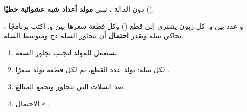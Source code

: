 \begin{statement}
دون الدالة ، نبني \textbf{مولد أعداد شبه عشوائية خطيًا} (): \par{\centering\small{}\par}، و عدد بين  و. كل زبون يشتري  إلى  قطع () وكل قطعة سعرها بين  و. اكتب برنامجًا يحاكي  سلة ويقدر \textbf{احتمال} أن تتجاوز السلة  دج ومتوسط السلة.
\end{statement}
\begin{stepsbox}\begin{enumerate}
\item نستعمل  للمولد لتجنب تجاوز السعة.
\item لكل سلة: نولد عدد القطع، ثم لكل قطعة نولد سعرًا .
\item نعد السلات التي تتجاوز  ونجمع المبالغ.
\item الاحتمال ≈ .
\end{enumerate}\end{stepsbox}
